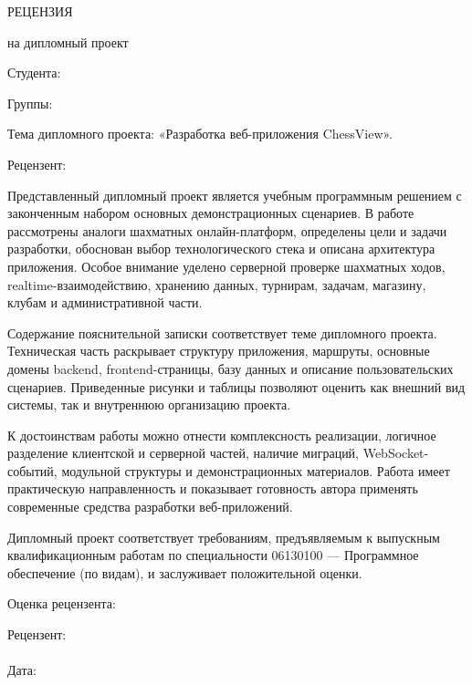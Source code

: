 \clearpage
\thispagestyle{plain}
\begin{center}
РЕЦЕНЗИЯ

на дипломный проект
\end{center}

Студента: 

Группы: 

Тема дипломного проекта: «Разработка веб-приложения ChessView».

Рецензент: 

\vspace{0.5cm}
Представленный дипломный проект является учебным программным решением с законченным набором основных демонстрационных сценариев. В работе рассмотрены аналоги шахматных онлайн-платформ, определены цели и задачи разработки, обоснован выбор технологического стека и описана архитектура приложения. Особое внимание уделено серверной проверке шахматных ходов, realtime-взаимодействию, хранению данных, турнирам, задачам, магазину, клубам и административной части.

Содержание пояснительной записки соответствует теме дипломного проекта. Техническая часть раскрывает структуру приложения, маршруты, основные домены backend, frontend-страницы, базу данных и описание пользовательских сценариев. Приведенные рисунки и таблицы позволяют оценить как внешний вид системы, так и внутреннюю организацию проекта.

К достоинствам работы можно отнести комплексность реализации, логичное разделение клиентской и серверной частей, наличие миграций, WebSocket-событий, модульной структуры и демонстрационных материалов. Работа имеет практическую направленность и показывает готовность автора применять современные средства разработки веб-приложений.

Дипломный проект соответствует требованиям, предъявляемым к выпускным квалификационным работам по специальности 06130100 --- Программное обеспечение (по видам), и заслуживает положительной оценки.

\vspace{0.4cm}
Оценка рецензента: 

\vspace{0.25cm}
\begin{flushright}
Рецензент: \filledfield{6cm}{[подпись]}\\[0.4cm]
\\[0.4cm]
Дата: 
\end{flushright}
